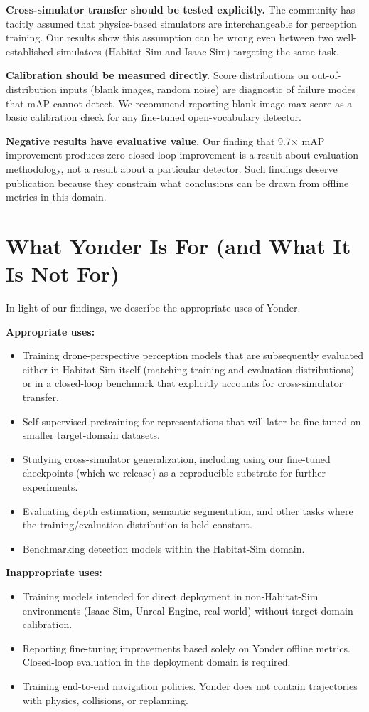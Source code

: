 \documentclass[conference]{IEEEtran}
\begin{document}
\textbf{Cross-simulator transfer should be tested explicitly.} The community has tacitly assumed that physics-based simulators are interchangeable for perception training. Our results show this assumption can be wrong even between two well-established simulators (Habitat-Sim and Isaac Sim) targeting the same task.

\textbf{Calibration should be measured directly.} Score distributions on out-of-distribution inputs (blank images, random noise) are diagnostic of failure modes that mAP cannot detect. We recommend reporting blank-image max score as a basic calibration check for any fine-tuned open-vocabulary detector.

\textbf{Negative results have evaluative value.} Our finding that 9.7$\times$ mAP improvement produces zero closed-loop improvement is a result about evaluation methodology, not a result about a particular detector. Such findings deserve publication because they constrain what conclusions can be drawn from offline metrics in this domain.

\section{What Yonder Is For (and What It Is Not For)}

In light of our findings, we describe the appropriate uses of Yonder.

\textbf{Appropriate uses:}
\begin{itemize}
\item Training drone-perspective perception models that are subsequently evaluated either in Habitat-Sim itself (matching training and evaluation distributions) or in a closed-loop benchmark that explicitly accounts for cross-simulator transfer.
\item Self-supervised pretraining for representations that will later be fine-tuned on smaller target-domain datasets.
\item Studying cross-simulator generalization, including using our fine-tuned checkpoints (which we release) as a reproducible substrate for further experiments.
\item Evaluating depth estimation, semantic segmentation, and other tasks where the training/evaluation distribution is held constant.
\item Benchmarking detection models within the Habitat-Sim domain.
\end{itemize}

\textbf{Inappropriate uses:}
\begin{itemize}
\item Training models intended for direct deployment in non-Habitat-Sim environments (Isaac Sim, Unreal Engine, real-world) without target-domain calibration.
\item Reporting fine-tuning improvements based solely on Yonder offline metrics. Closed-loop evaluation in the deployment domain is required.
\item Training end-to-end navigation policies. Yonder does not contain trajectories with physics, collisions, or replanning.
\end{itemize}
\end{document}
